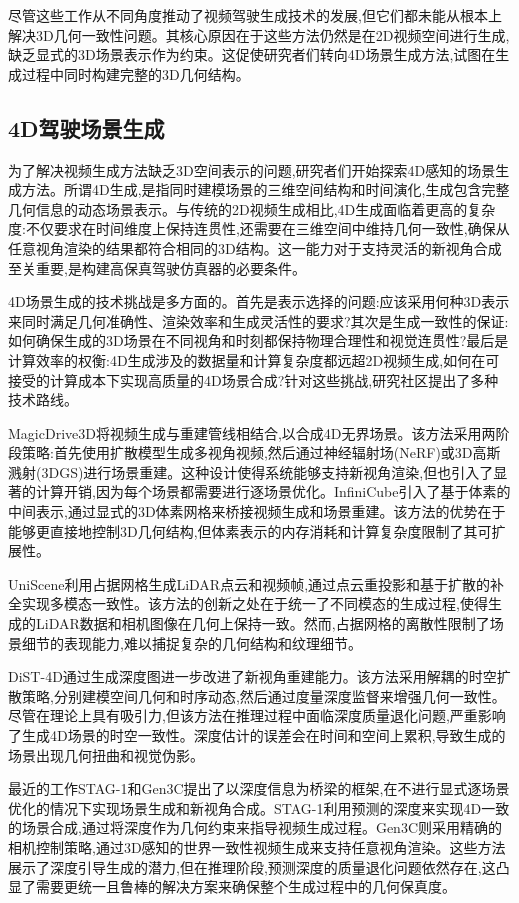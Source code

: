 尽管这些工作从不同角度推动了视频驾驶生成技术的发展,但它们都未能从根本上解决3D几何一致性问题。其核心原因在于这些方法仍然是在2D视频空间进行生成,缺乏显式的3D场景表示作为约束。这促使研究者们转向4D场景生成方法,试图在生成过程中同时构建完整的3D几何结构。

\subsection{4D驾驶场景生成}

为了解决视频生成方法缺乏3D空间表示的问题,研究者们开始探索4D感知的场景生成方法。所谓4D生成,是指同时建模场景的三维空间结构和时间演化,生成包含完整几何信息的动态场景表示。与传统的2D视频生成相比,4D生成面临着更高的复杂度:不仅要求在时间维度上保持连贯性,还需要在三维空间中维持几何一致性,确保从任意视角渲染的结果都符合相同的3D结构。这一能力对于支持灵活的新视角合成至关重要,是构建高保真驾驶仿真器的必要条件。

4D场景生成的技术挑战是多方面的。首先是表示选择的问题:应该采用何种3D表示来同时满足几何准确性、渲染效率和生成灵活性的要求?其次是生成一致性的保证:如何确保生成的3D场景在不同视角和时刻都保持物理合理性和视觉连贯性?最后是计算效率的权衡:4D生成涉及的数据量和计算复杂度都远超2D视频生成,如何在可接受的计算成本下实现高质量的4D场景合成?针对这些挑战,研究社区提出了多种技术路线。

MagicDrive3D\cite{gao2024magicdrive3d}将视频生成与重建管线相结合,以合成4D无界场景。该方法采用两阶段策略:首先使用扩散模型生成多视角视频,然后通过神经辐射场(NeRF)或3D高斯溅射(3DGS)进行场景重建。这种设计使得系统能够支持新视角渲染,但也引入了显著的计算开销,因为每个场景都需要进行逐场景优化。InfiniCube\cite{lu2024infinicube}引入了基于体素的中间表示,通过显式的3D体素网格来桥接视频生成和场景重建。该方法的优势在于能够更直接地控制3D几何结构,但体素表示的内存消耗和计算复杂度限制了其可扩展性。

UniScene\cite{li2025uniscene}利用占据网格生成LiDAR点云和视频帧,通过点云重投影和基于扩散的补全实现多模态一致性。该方法的创新之处在于统一了不同模态的生成过程,使得生成的LiDAR数据和相机图像在几何上保持一致。然而,占据网格的离散性限制了场景细节的表现能力,难以捕捉复杂的几何结构和纹理细节。

DiST-4D\cite{guo2025dist4d}通过生成深度图进一步改进了新视角重建能力。该方法采用解耦的时空扩散策略,分别建模空间几何和时序动态,然后通过度量深度监督来增强几何一致性。尽管在理论上具有吸引力,但该方法在推理过程中面临深度质量退化问题,严重影响了生成4D场景的时空一致性。深度估计的误差会在时间和空间上累积,导致生成的场景出现几何扭曲和视觉伪影。

最近的工作STAG-1\cite{wang2024stag1}和Gen3C\cite{ren2025gen3c}提出了以深度信息为桥梁的框架,在不进行显式逐场景优化的情况下实现场景生成和新视角合成。STAG-1利用预测的深度来实现4D一致的场景合成,通过将深度作为几何约束来指导视频生成过程。Gen3C则采用精确的相机控制策略,通过3D感知的世界一致性视频生成来支持任意视角渲染。这些方法展示了深度引导生成的潜力,但在推理阶段,预测深度的质量退化问题依然存在,这凸显了需要更统一且鲁棒的解决方案来确保整个生成过程中的几何保真度。

